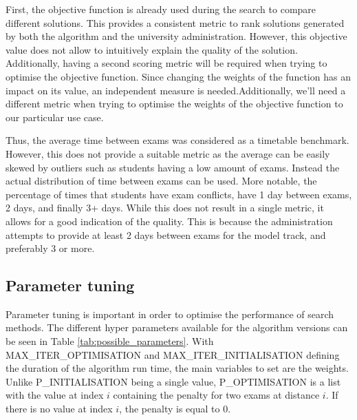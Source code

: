 First, the objective function is already used during the search to compare different solutions. This provides a  consistent metric to rank  solutions generated by both the algorithm and the university administration. However, this objective value does not allow to intuitively explain the quality of the solution. Additionally, having a second scoring metric will be required when trying to optimise the objective function. Since changing the weights of the function has an impact on its value, an independent measure is needed.Additionally, we'll need a different metric when trying to optimise the weights of the objective function to our particular use case. 

Thus, the average time between exams was considered as a timetable benchmark. However, this does not provide a suitable metric as the average can be easily skewed by outliers such as students having a low amount of exams. Instead the actual distribution of time between exams can be used. More notable, the percentage of times that students have exam conflicts, have 1 day between exams, 2 days, and finally 3+ days. While this does not result in a single metric, it allows for a good indication of the quality. This is because the administration attempts to provide at least 2 days between exams for the model track, and preferably 3 or more.

\subsection{Parameter tuning} \label{tuning}

Parameter tuning is important in order to optimise the performance of search methods. The different hyper parameters  available for the algorithm versions can be seen in Table \ref{tab:possible_parameters}. With MAX\_ITER\_OPTIMISATION and MAX\_ITER\_INITIALISATION defining the duration of the algorithm run time, the main variables to set are the weights. Unlike P\_INITIALISATION being a single value, P\_OPTIMISATION is a list with the value at index $i$ containing the penalty for two exams at distance $i$. If there is no value at index $i$, the penalty is equal to 0.

